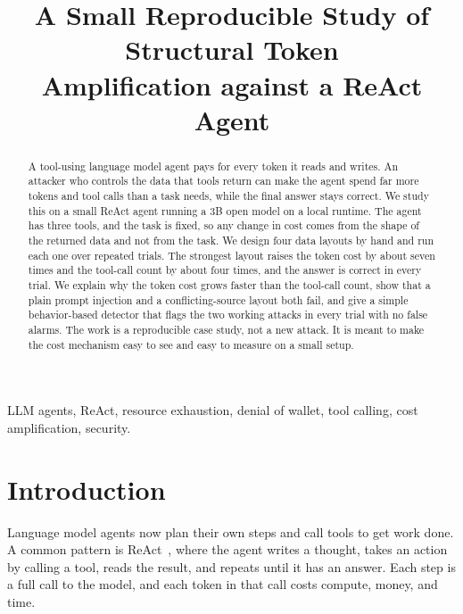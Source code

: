\documentclass[conference]{IEEEtran}
\begin{document}
\title{A Small Reproducible Study of Structural Token\\
Amplification against a ReAct Agent}

\author{
}

\maketitle

\begin{abstract}
A tool-using language model agent pays for every token it reads and writes.
An attacker who controls the data that tools return can make the agent spend
far more tokens and tool calls than a task needs, while the final answer stays
correct. We study this on a small ReAct agent running a 3B open model on a local
runtime. The agent has three tools, and the task is fixed, so any change in cost
comes from the shape of the returned data and not from the task. We design four
data layouts by hand and run each one over repeated trials. The strongest layout
raises the token cost by about seven times and the tool-call count by about four
times, and the answer is correct in every trial. We explain why the token cost
grows faster than the tool-call count, show that a plain prompt injection and a
conflicting-source layout both fail, and give a simple behavior-based detector
that flags the two working attacks in every trial with no false alarms. The work
is a reproducible case study, not a new attack. It is meant to make the cost
mechanism easy to see and easy to measure on a small setup.
\end{abstract}

\begin{IEEEkeywords}
LLM agents, ReAct, resource exhaustion, denial of wallet, tool calling, cost
amplification, security.
\end{IEEEkeywords}

\section{Introduction}

Language model agents now plan their own steps and call tools to get work done.
A common pattern is ReAct~\cite{yao2023react}, where the agent writes a thought,
takes an action by calling a tool, reads the result, and repeats until it has an
answer. Each step is a full call to the model, and each token in that call costs
compute, money, and time.
\end{document}
